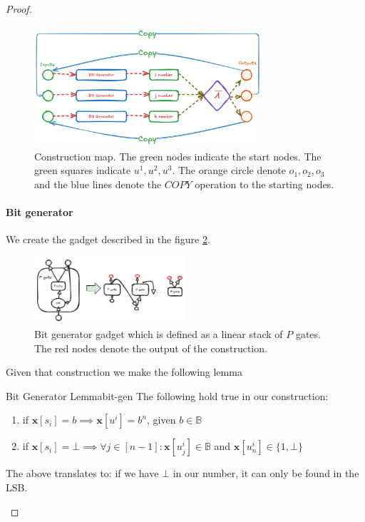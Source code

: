 \begin{proof}
\begin{figure}[h!]
    \centering
    \includegraphics[width=0.75\textwidth]{assets/reduction_sketch.png}
    \caption{Construction map. The green nodes indicate the start nodes. The green squares indicate $u^1, u^2, u^3$. The orange circle denote
    $o_1, o_2, o_3$ and the blue lines denote the $\textit{COPY}$ operation to the starting nodes.}
    \label{fig:main-proof:visualisation}
\end{figure}


\paragraph{Bit generator}

We create the gadget described in the figure \ref{fig:main-proof:purification}.

\begin{figure}[h!]
    \centering
    \includegraphics[width=0.5\textwidth, clip]{assets/purification_generator.png}
    \caption{Bit generator gadget which is defined as a linear stack of $P$ gates. The red nodes denote the output of the construction.} 
    \label{fig:main-proof:purification}
\end{figure}
\FloatBarrier

Given that construction we make the following lemma

\begin{lemmabox}{Bit Generator Lemma}{bit-gen}
    The following hold true in our construction:
    \begin{enumerate}
        \item if $\mathbf{x}[s_i] = b \implies \mathbf{x}[u^i] = b^n$, given $b \in \mathbb{B}$
        \item if $\mathbf{x}[s_i] = \bot \implies \forall j \in [n-1]: \mathbf{x}[u^i_j] \in \mathbb{B}$ and $\mathbf{x}[u^i_{n}] \in \{1, \bot\}$
    \end{enumerate}
    The above translates to: if we have $\bot$ in our number, it can only be found in the LSB.
\end{lemmabox}


\end{proof}
